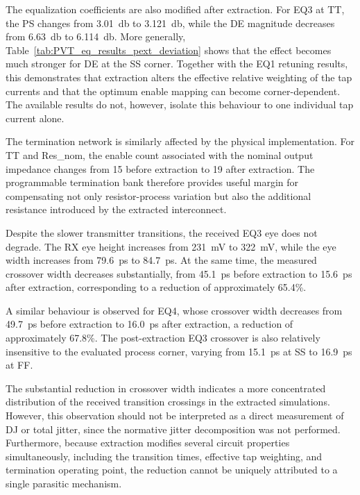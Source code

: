 The equalization coefficients are also modified after extraction. For EQ3 at \ac{TT}, the \ac{PS} changes from \SI{3.01}{\decibel} to \SI{3.121}{\decibel}, while the \ac{DE} magnitude decreases from \SI{6.63}{\decibel} to \SI{6.114}{\decibel}. More generally, Table~\ref{tab:PVT_eq_results_pext_deviation} shows that the effect becomes much stronger for \ac{DE} at the \ac{SS} corner. Together with the EQ1 retuning results, this demonstrates that extraction alters the effective relative weighting of the tap currents and that the optimum enable mapping can become corner-dependent. The available results do not, however, isolate this behaviour to one individual tap current alone.

The termination network is similarly affected by the physical implementation. For \ac{TT} and Res\_nom, the enable count associated with the nominal output impedance changes from 15 before extraction to 19 after extraction. The programmable termination bank therefore provides useful margin for compensating not only resistor-process variation but also the additional resistance introduced by the extracted interconnect.

Despite the slower transmitter transitions, the received EQ3 eye does not degrade. The \ac{RX} eye height increases from \SI{231}{\milli\volt} to \SI{322}{\milli\volt}, while the eye width increases from \SI{79.6}{\pico\second} to \SI{84.7}{\pico\second}. At the same time, the measured crossover width decreases substantially, from \SI{45.1}{\pico\second} before extraction to \SI{15.6}{\pico\second} after extraction, corresponding to a reduction of approximately 65.4\%.

A similar behaviour is observed for EQ4, whose crossover width decreases from \SI{49.7}{\pico\second} before extraction to \SI{16.0}{\pico\second} after extraction, a reduction of approximately 67.8\%. The post-extraction EQ3 crossover is also relatively insensitive to the evaluated process corner, varying from \SI{15.1}{\pico\second} at \ac{SS} to \SI{16.9}{\pico\second} at \ac{FF}.

The substantial reduction in crossover width indicates a more concentrated distribution of the received transition crossings in the extracted simulations. However, this observation should not be interpreted as a direct measurement of \ac{DJ} or total jitter, since the normative jitter decomposition was not performed. Furthermore, because extraction modifies several circuit properties simultaneously, including the transition times, effective tap weighting, and termination operating point, the reduction cannot be uniquely attributed to a single parasitic mechanism.


